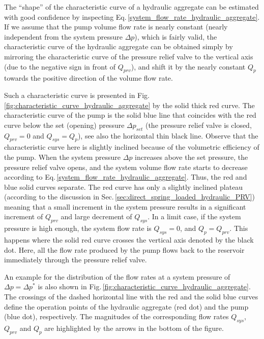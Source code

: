 The ``shape'' of the characteristic curve of a hydraulic aggregate can be estimated with good confidence by inspecting Eq.\,\eqref{system_flow_rate_hydraulic_aggregate}. If we assume that the pump volume flow rate is nearly constant (nearly independent from the system pressure $\Delta p$), which is fairly valid, the characteristic curve of the hydraulic aggregate can be obtained simply by mirroring the characteristic curve of the pressure relief valve to the vertical axis (due to the negative sign in front of $Q_{prv}$), and shift it by the nearly constant $Q_p$ towards the positive direction of the volume flow rate.

Such a characteristic curve is presented in Fig.\,\ref{fig:characteristic_curve_hydraulic_aggregate} by the solid thick red curve. The characteristic curve of the pump is the solid blue line that coincides with the red curve below the set (opening) pressure $\Delta p_{set}$ (the pressure relief valve is closed, $Q_{prv}=0$ and $Q_{sys}=Q_p$), see also the horizontal thin black line. Observe that the characteristic curve here is slightly inclined because of the volumetric efficiency of the pump. When the system pressure $\Delta p$ increases above the set pressure, the pressure relief valve opens, and the system volume flow rate starts to decrease according to Eq.\,\eqref{system_flow_rate_hydraulic_aggregate}. Thus, the red and blue solid curves separate. The red curve has only a slightly inclined plateau (according to the discussion in Sec.\,\ref{sec:direct_spring_loaded_hydraulic_PRV}) meaning that a small increment in the system pressure results in a significant increment of $Q_{prv}$ and large decrement of $Q_{sys}$. In a limit case, if the system pressure is high enough, the system flow rate is $Q_{sys}=0$, and $Q_p=Q_{prv}$. This happens where the solid red curve crosses the vertical axis denoted by the black dot. Here, all the flow rate produced by the pump flows back to the reservoir immediately through the pressure relief valve.

An example for the distribution of the flow rates at a system pressure of $\Delta p=\Delta p^*$ is also shown in Fig.\,\ref{fig:characteristic_curve_hydraulic_aggregate}. The crossings of the dashed horizontal line with the red and the solid blue curves define the operation points of the hydraulic aggregate (red dot) and the pump (blue dot), respectively. The magnitudes of the corresponding flow rates $Q_{sys}$, $Q_{prv}$ and $Q_p$ are highlighted by the arrows in the bottom of the figure.

